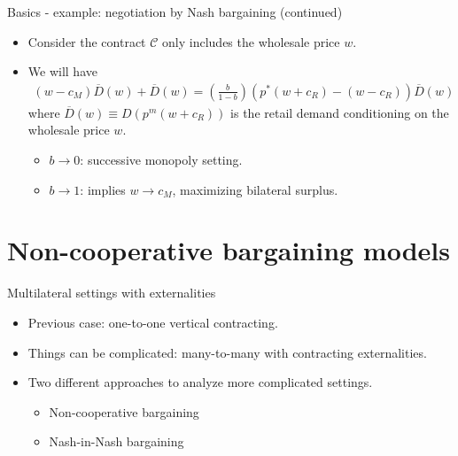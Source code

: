 \documentclass[aspectratio=169]{beamer}  %
\begin{document}
\begin{frame}{Basics - example: negotiation by Nash bargaining (continued)}
    \begin{itemize}
        \item Consider the contract $\mathcal{C}$ only includes the wholesale price $w$. \vspace{.2cm}
        \item We will have
        \begin{align}
            (w - c_M) \overline{D}(w) + \overline{D}(w) = \left( \frac{b}{1 - b} \right) \left( p^* \left( w + c_R \right) - (w - c_R) \right) \overline{D}(w)
        \end{align}
        where $\overline{D}(w) \equiv D(p^m(w+c_R))$ is the retail demand conditioning on the wholesale price $w$. \vspace{.2cm}
        \begin{itemize}
            \item $b\rightarrow0$: successive monopoly setting. \vspace{.2cm}
            \item $b\rightarrow1$: implies $w\rightarrow c_M$, maximizing bilateral surplus. \vspace{.2cm}
        \end{itemize}
    \end{itemize}

\end{frame}

\section{Non-cooperative bargaining models}
\begin{frame}{Multilateral settings with externalities}
    \begin{itemize}
        \item Previous case: one-to-one vertical contracting. \vspace{.2cm}
        \item Things can be complicated: many-to-many with contracting externalities. \vspace{.2cm}
        \item Two different approaches to analyze more complicated settings. \vspace{.2cm}
        \begin{itemize}
            \item Non-cooperative bargaining \vspace{.2cm}
            \item Nash-in-Nash bargaining \vspace{.2cm}
        \end{itemize}
    \end{itemize}

\end{frame}
\end{document}
